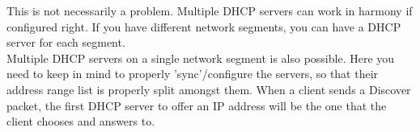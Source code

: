 This is not necessarily a problem. Multiple DHCP servers can work in harmony if configured right. If you have different network segments, you can have a DHCP server for each segment. \\
Multiple DHCP servers on a single network segment is also possible. Here you need to keep in mind to properly 'sync'/configure the servers, so that their address range list is properly split amongst them. When a client sends a Discover packet, the first DHCP server to offer an IP address will be the one that the client chooses and answers to.
